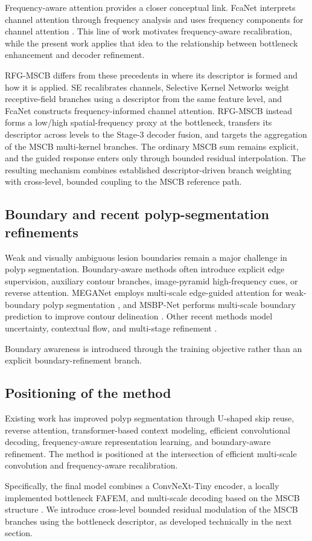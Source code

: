 Frequency-aware attention provides a closer conceptual link. FcaNet interprets
channel attention through frequency analysis and uses frequency components for
channel attention \cite{fcanet}. This line of work motivates frequency-aware
recalibration, while the present work applies that idea to the relationship
between bottleneck enhancement and decoder refinement.

RFG-MSCB differs from these precedents in where its descriptor is formed and how it
is applied. SE recalibrates channels, Selective Kernel Networks weight receptive-field
branches using a descriptor from the same feature level, and FcaNet constructs
frequency-informed channel attention. RFG-MSCB instead forms a low/high
spatial-frequency proxy at the bottleneck, transfers its descriptor across levels to
the Stage-3 decoder fusion, and targets the aggregation of the MSCB multi-kernel
branches. The ordinary MSCB sum remains explicit, and the guided response enters only
through bounded residual interpolation. The resulting mechanism combines established
descriptor-driven branch weighting with cross-level, bounded coupling to the MSCB
reference path.

\subsection{Boundary and recent polyp-segmentation refinements}

Weak and visually ambiguous lesion boundaries remain a major challenge in polyp
segmentation. Boundary-aware methods often introduce explicit edge supervision,
auxiliary contour branches, image-pyramid high-frequency cues, or reverse
attention. MEGANet employs multi-scale edge-guided attention for weak-boundary
polyp segmentation \cite{meganet}, and MSBP-Net performs multi-scale boundary
prediction to improve contour delineation \cite{msbpnet}. Other recent methods
model uncertainty, contextual flow, and multi-stage refinement
\cite{mein,cifformer,pranetv2}.

Boundary awareness is introduced through the training objective rather than an
explicit boundary-refinement branch.

\subsection{Positioning of the method}

Existing work has improved polyp segmentation through U-shaped skip reuse,
reverse attention, transformer-based context modeling, efficient convolutional
decoding, frequency-aware representation learning, and boundary-aware
refinement. The method is positioned at the intersection of efficient
multi-scale convolution and frequency-aware recalibration.

Specifically, the final model combines a ConvNeXt-Tiny encoder, a locally implemented
bottleneck FAFEM, and multi-scale decoding based on the MSCB structure \cite{emcad}.
We introduce cross-level bounded residual modulation of the MSCB branches using the
bottleneck descriptor, as developed technically in the next section.
